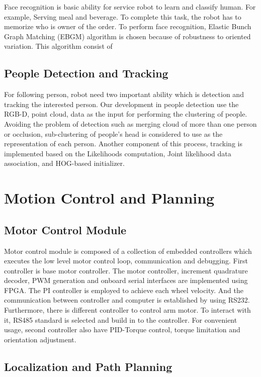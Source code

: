 \documentclass{llncs}
\begin{document}
Face recognition is basic ability for service robot to learn and classify human. For example, Serving meal and beverage. To complete this task, the robot has to memorize who is owner of the order. To perform face recognition, Elastic Bunch Graph Matching (EBGM) algorithm is chosen because of robustness to oriented variation. This algorithm consist of 

\subsection{People Detection and Tracking}

For following person, robot need two important ability which is detection and tracking the interested person. Our development in people detection use the RGB-D, point cloud, data as the input for performing the clustering of people. Avoiding the problem of detection such as merging cloud of more than one person or occlusion, sub-clustering of people's head is considered to use as the representation of each person. Another component of this process, tracking is implemented based on the Likelihoods computation, Joint likelihood data association, and HOG-based initializer.

\section{Motion Control and Planning}

\subsection{Motor Control Module}

Motor control module is composed of a collection of embedded controllers which executes the low level motor control loop, communication and debugging. First controller is base motor controller. The motor controller, increment quadrature decoder, PWM generation and onboard serial interfaces are implemented using FPGA. The PI controller is employed to achieve each wheel velocity. And the communication between controller and computer is established by using RS232. Furthermore, there is different controller to control arm motor. To interact with it, RS485 standard is selected and build in to the controller. For convenient usage, second controller also have PID-Torque control, torque limitation and orientation adjustment\cite{con_arm}. 

\subsection{Localization and Path Planning}
\end{document}
